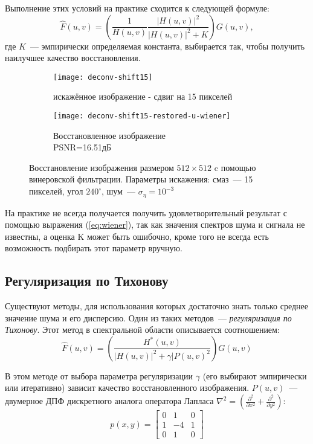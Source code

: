Выполнение этих условий на практике сходится к следующей формуле:
\begin{equation}\label{eq:wiener}
\hat{F}(u,v)=\left(\frac{1}{H(u,v)}\frac{|H(u,v)|^2}{|H(u,v)|^2+K}\right)G(u,v),
\end{equation}
где $K$~--- эмпирически определяемая константа, выбирается так, чтобы получить наилучшее качество восстановления.

\begin{figure}
	\begin{subfigure}[b]{0.5\textwidth}
		\texttt{[image: deconv-shift15]}
		\caption{искажённое изображение - сдвиг на 15 пикселей}
		\label{fig:astroShift10}
	\end{subfigure}%
	\begin{subfigure}[b]{0.5\textwidth}
		\texttt{[image: deconv-shift15-restored-u-wiener]}
		\caption{Восстановленное изображение\\ PSNR=16.51дБ}
		\label{fig:astroInverseRestored}
	\end{subfigure}%
	\caption{Восстановление изображения размером $512\times 512$ c помощью винеровской фильтрации. Параметры искажения: смаз~--- 15 пикселей, угол $240^\circ$, шум~--- $\sigma_\eta=10^{-3}$}
\end{figure}
На практике не всегда получается получить удовлетворительный результат с помощью выражения (\ref{eq:wiener}), так как значения спектров шума и сигнала не известны, а оценка K может быть ошибочно, кроме того не всегда есть возможность подбирать этот параметр вручную.

\subsection{Регуляризация по Тихонову}
Существуют методы, для использования которых достаточно знать только среднее значение шума и его дисперсию. Один из таких методов~--- \textit{регуляризация по Тихонову}. Этот метод в спектральной области описывается соотношением\cite[стр.~418]{gonsalesDigital2012}:
\begin{equation}\label{eq:tikhonov}
\hat{F}(u,v) = \left(\frac{H^*(u,v)}{|H(u,v)|^2 + \gamma|P(u,v)^2}\right)G(u,v)
\end{equation}

В этом методе от выбора параметра регуляризации $\gamma$ (его выбирают эмпирически или итеративно) зависит качество восстановленного изображения. $P(u,v)$~--- двумерное ДПФ дискретного аналога оператора Лапласа $\nabla^2 = \left(\frac{\partial^2}{\partial x^2} + \frac{\partial^2}{\partial y^2}\right)$:
\begin{equation}
p(x,y) = \begin{bmatrix}
		0 & 1 & 0\\
		1 &-4 & 1\\
		0 & 1 & 0
	\end{bmatrix}
\end{equation}
